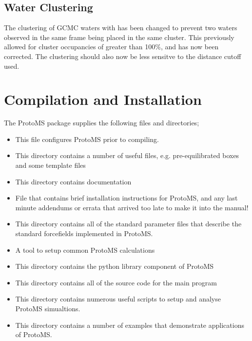 \documentclass[letterpaper,10pt,english]{sphinxmanual}
\begin{document}
\section{Water Clustering}
\label{\detokenize{changelog:water-clustering}}
The clustering of GCMC waters with  has been changed to prevent two waters observed in the same frame being placed in the same cluster. This previously allowed for cluster occupancies of greater than 100\%, and has now been corrected. The clustering should also now be less sensitve to the distance cutoff used.


\chapter{Compilation and Installation}
\label{\detokenize{compilation:compilation-and-installation}}\label{\detokenize{compilation::doc}}
The ProtoMS package supplies the following files and directories;
\begin{itemize}
\item {} 
 This file configures ProtoMS prior to compiling.

\item {} 
 This directory contains a number of useful files, e.g. pre-equilibrated boxes and some template files

\item {} 
 This directory contains documentation

\item {} 
 File that contains brief installation instructions for ProtoMS, and any last minute addendums or errata that arrived too late to make it into the manual!

\item {} 
 This directory contains all of the standard parameter files that describe the standard forcefields implemented in ProtoMS.

\item {} 
 A tool to setup common ProtoMS calculations

\item {} 
 This directory contains the python library component of ProtoMS

\item {} 
 This directory contains all of the source code for the main program

\item {} 
 This directory contains numerous useful scripts to setup and analyse ProtoMS simualtions.

\item {} 
 This directory contains a number of examples that demonstrate applications of ProtoMS.

\end{itemize}
\end{document}
